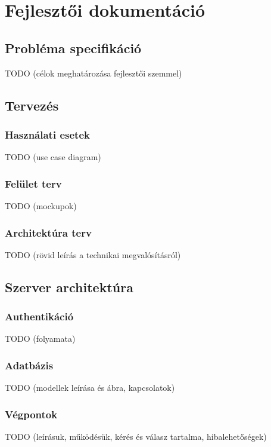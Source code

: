 \documentclass{elteikthesis}
\begin{document}
	\chapter{Fejlesztői dokumentáció}

		\section{Probléma specifikáció}
		TODO (célok meghatározása fejlesztői szemmel)

		\section{Tervezés}

			\subsection{Használati esetek}
			TODO (use case diagram)
			
			\subsection{Felület terv}
			TODO (mockupok)
			
			\subsection{Architektúra terv}
			TODO (rövid leírás a technikai megvalósításról)
		
		\section{Szerver architektúra}

			\subsection{Authentikáció}
			TODO (folyamata)
			
			\subsection{Adatbázis}
			TODO (modellek leírása és ábra, kapcsolatok)
			
			\subsection{Végpontok}
			TODO (leírásuk, működésük, kérés és válasz tartalma, hibalehetőségek)
			
\end{document}
